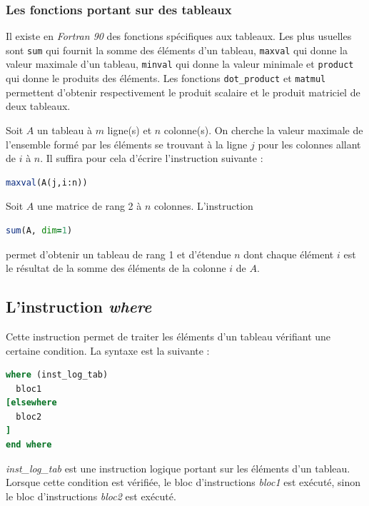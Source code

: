 \documentclass[a4paper,twoside]{article}
\begin{document}
\subsubsection{Les fonctions portant sur des tableaux}

Il existe en \emph{Fortran 90} des fonctions spécifiques aux tableaux. Les plus usuelles sont \texttt{sum} qui fournit la somme des éléments d'un tableau, \texttt{maxval} qui donne la valeur maximale d'un tableau, \texttt{minval} qui donne la valeur minimale et \texttt{product} qui donne le produits des éléments. Les fonctions \texttt{dot\_product} et \texttt{matmul} permettent d'obtenir respectivement le produit scalaire et le produit matriciel de deux tableaux.

\begin{exemple}
Soit $A$ un tableau à $m$ ligne(s) et $n$ colonne(s). On cherche la valeur maximale de l'ensemble formé par les éléments se trouvant à la ligne $j$ pour les colonnes allant de $i$ à $n$. Il suffira pour cela d'écrire l'instruction suivante :
\begin{lstlisting}[language=Fortran]
maxval(A(j,i:n))
\end{lstlisting}

\bigskip

Soit $A$ une matrice de rang 2 à $n$ colonnes. L'instruction 
\begin{lstlisting}[language=Fortran]
sum(A, dim=1)
\end{lstlisting}
permet d'obtenir un tableau de rang 1 et d'étendue $n$ dont chaque élément $i$ est le résultat de la somme des éléments de la colonne $i$ de $A$.
\end{exemple}


\subsection{L'instruction \emph{where}}

Cette instruction permet de traiter les éléments d'un tableau vérifiant une certaine condition. La syntaxe est la suivante :

\begin{lstlisting}[language=Fortran]
where (inst_log_tab)
  bloc1 
[elsewhere 
  bloc2 
] 
end where
\end{lstlisting}
\emph{inst\_log\_tab} est une instruction logique portant sur les éléments d'un tableau. Lorsque cette condition est vérifiée, le bloc d'instructions \emph{bloc1} est exécuté, sinon le bloc d'instructions \emph{bloc2} est exécuté. 
\end{document}
